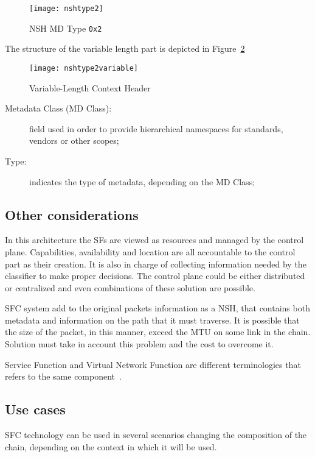 \begin{figure}[H]
  \centering
  \texttt{[image: nshtype2]}
  \caption[NSH MD Type \texttt{0x2}]{NSH MD Type \texttt{0x2}~\cite{rfc8300}}
  \label{chap:background:img:nshtype2}
\end{figure}

The structure of the variable length part is depicted in
Figure~\ref{chap:background:img:nshtype2variable}

\begin{figure}[H]
  \centering
  \texttt{[image: nshtype2variable]}
  \caption[Variable-Length Context Header]{Variable-Length Context
    Header~\cite{rfc8300}}
  \label{chap:background:img:nshtype2variable}
\end{figure}

\begin{description}
  \item[Metadata Class (MD Class):] field used in order to provide hierarchical
  namespaces for standards, vendors or other scopes;
  \item[Type:] indicates the type of metadata, depending on the MD Class;
\end{description}

\subsection{Other considerations}
In this architecture the SFs are viewed as resources and managed by the control
plane. Capabilities, availability and location are all accountable to the
control part as their creation. It is also in charge of collecting information
needed by the classifier to make proper decisions. The control plane could be
either distributed or centralized and even combinations of these solution are
possible.

SFC system add to the original packets information as a NSH, that contains both
metadata and information on the path that it must traverse. It is possible that
the size of the packet, in this manner, exceed the MTU on some link in the
chain. Solution must take in account this problem and the cost to overcome it.

Service Function and Virtual Network Function are different terminologies that
refers to the same component~\cite{medhat2017service}.

\subsection{Use cases}
SFC technology can be used in several scenarios changing the composition of the
chain, depending on the context in which it will be used.

